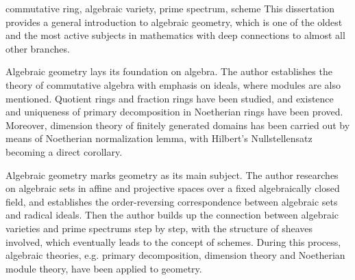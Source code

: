 

\begin{abstract}{交换幺环, 代数簇, 素谱, 概型}
  代数几何历史悠久而又充满活力, 与其它数学分支有着深刻的联系, 是一门重要的学科. 代数几何包含代数与几何, 可以认为是将代数理论应用到几何的研究之中.

  代数几何的理论根基在于代数. 本文从基本定义开始建立了以环论为主模论为辅的交换代数理论, 研究了商环与分式环的基本性质, 证明了Noether环上准素分解的存在性及其满足的唯一性, 以域论为基础利用Noether正规化引理证明了域的有限生成整环上的维数定理和Hilbert零点定理.

  代数几何的研究对象在于几何. 本文研究了固定代数闭域上的仿射与射影空间中的代数集, 建立了根式理想与代数集之间的对应, 并逐步建立了代数簇与素谱之间的对应, 最终引出了概型的概念. 在此过程中, 本文将代数中的准素分解, 维数理论与几何相联系, 并将Noether模论应用到几何中.
\end{abstract}

\begin{abstract*}{commutative ring, algebraic variety, prime spectrum, scheme}
  This dissertation provides a general introduction to algebraic geometry, which is one of the oldest and the most active subjects in mathematics with deep connections to almost all other branches.

  Algebraic geometry lays its foundation on algebra. The author establishes the theory of commutative algebra with emphasis on ideals, where modules are also mentioned. Quotient rings and fraction rings have been studied, and existence and uniqueness of primary decomposition in Noetherian rings have been proved. Moreover, dimension theory of finitely generated domains has been carried out by means of Noetherian normalization lemma, with Hilbert's Nullstellensatz becoming a direct corollary.

  Algebraic geometry marks geometry as its main subject. The author researches on algebraic sets in affine and projective spaces over a fixed algebraically closed field, and establishes the order-reversing correspondence between algebraic sets and radical ideals. Then the author builds up the connection between algebraic varieties and prime spectrums step by step, with the structure of sheaves involved, which eventually leads to the concept of schemes. During this process, algebraic theories, e.g. primary decomposition, dimension theory and Noetherian module theory, have been applied to geometry.
\end{abstract*}

